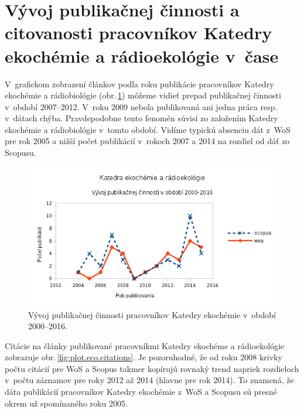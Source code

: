 \section{Vývoj publikačnej činnosti a citovanosti pracovníkov Katedry ekochémie
  a rádioekológie v~čase}

V~grafickom zobrazení článkov podľa roku publikácie pracovníkov Katedry
ekochémie a rádiobiológie (obr.\,\ref{fig:plot.eco.publications}) môžeme vidieť
prepad publikačnej činnosti v~období 2007--2012.  V~roku 2009 nebola publikovaná
ani jedna práca resp. v~dátach chýba.  Pravdepodobne tento fenomén súvisí zo
založením Katedry ekochémie a rádiobiológie v~tomto období.  Vidíme typickú
absenciu dát z~WoS pre rok 2005 a nižší počet publikácií v~rokoch 2007 a 2014 na
rozdiel od dáť zo Scopusu.

\begin{figure}
  \centering
  \includegraphics[width=\textwidth]{obr/plot-eco-publications.png}
  \caption{Vývoj publikačnej činnosti  pracovníkov Katedry ekochémie v~období 2000--2016.}
  \label{fig:plot.eco.publications}
\end{figure}

Citácie na články publikované pracovníkmi Katedry ekochéme a rádioekológie
zobrazuje obr.\,\ref{fig:plot.eco.citations}.  Je pozoruhodné, že od roku 2008
krivky počtu citácií pre WoS a Scopus takmer kopírujú rovnaký trend napriek
rozdieloch v~počtu záznamov pre roky 2012 až 2014 (hlavne pre rok 2014).  To
znamená, že dáta publikácií pracovníkov Katedry ekochémie z~WoS a Scopusu sú
presné okrem už spomínaného roku 2005.

